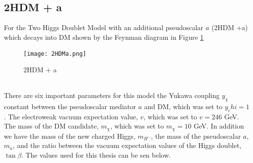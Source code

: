 \documentclass[12pt, a4paper]{book}
\begin{document}
\subsection{2HDM + a}
For the Two Higgs Doublet Model with an additional pseudoscalar $a$ (2HDM +a) which decays into DM shown by the Feynman diagram in Figure \ref{fig:2HDM}
\begin{figure}[!ht]
    \centering
    \texttt{[image: 2HDMa.png]}
    \caption{2HDM + a}\label{fig:2HDM}
\end{figure}
\\ There are six important parameters for this model the Yukawa coupling $y_\chi$ constant between the pseudoscalar mediator $a$ and DM, which was set to $y_chi=1$. The electroweak vacuum expectation value, $v$, which was set to $v=246$ GeV. 
The mass of the DM candidate, $m_\chi$, which was set to $m_\chi=10$ GeV. In addition we have the mass of the new charged Higgs, $m_{H^-}$, the mass of the pseudoscalar $a$, $m_a$, and the ratio between the vacuum expectation values of the Higgs doublet, $\tan\beta$. The values used for this thesis can be sen below.
\graphicspath{{../../../Plots/2d_masses/}}
\end{document}
